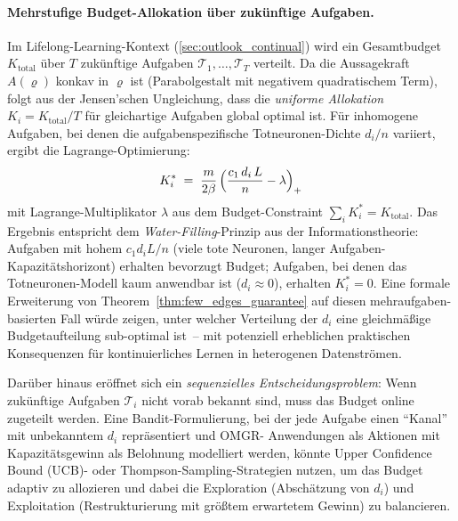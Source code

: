 ﻿\documentclass[12pt, a4paper, openany]{report}
\begin{document}
\paragraph{Mehrstufige Budget-Allokation über zukünftige Aufgaben.}
Im Lifelong-Learning-Kontext (\cref{sec:outlook_continual}) wird ein
Gesamtbudget $K_{\mathrm{total}}$ über $T$ zukünftige Aufgaben
$\mathcal{T}_1, \ldots, \mathcal{T}_T$ verteilt.  Da die Aussagekraft
$A(\varrho)$ konkav in $\varrho$ ist (Parabolgestalt mit negativem
quadratischem Term), folgt aus der Jensen'schen Ungleichung, dass die
\emph{uniforme Allokation} $K_i = K_{\mathrm{total}}/T$ für gleichartige
Aufgaben global optimal ist.  Für inhomogene Aufgaben, bei denen die
aufgabenspezifische Totneuronen-Dichte $d_i/n$ variiert, ergibt die
Lagrange-Optimierung:
\[
  K_i^*
  \;=\; \frac{m}{2\beta}\,\Bigl(\frac{c_{1}\,d_i\,L}{n} - \lambda\Bigr)_+
\]
mit Lagrange-Multiplikator $\lambda$ aus dem Budget-Constraint
$\sum_i K_i^* = K_{\mathrm{total}}$.  Das Ergebnis entspricht dem
\emph{Water-Filling}-Prinzip aus der Informationstheorie: Aufgaben mit
hohem $c_1 d_i L / n$ (viele tote Neuronen, langer Aufgaben-Kapazitätshorizont)
erhalten bevorzugt Budget; Aufgaben, bei denen das Totneuronen-Modell kaum
anwendbar ist ($d_i \approx 0$), erhalten $K_i^* = 0$.  Eine formale
Erweiterung von Theorem~\ref{thm:few_edges_guarantee} auf diesen
mehraufgaben-basierten Fall würde zeigen, unter welcher Verteilung der $d_i$
eine gleichmäßige Budgetaufteilung sub-optimal ist~-- mit potenziell
erheblichen praktischen Konsequenzen für kontinuierliches Lernen in
heterogenen Datenströmen.

Darüber hinaus eröffnet sich ein \emph{sequenzielles Entscheidungsproblem}:
Wenn zukünftige Aufgaben $\mathcal{T}_i$ nicht vorab bekannt sind, muss
das Budget online zugeteilt werden.  Eine Bandit-Formulierung, bei der jede
Aufgabe einen ``Kanal'' mit unbekanntem $d_i$ repräsentiert und OMGR-
Anwendungen als Aktionen mit Kapazitätsgewinn als Belohnung modelliert
werden, könnte Upper Confidence Bound (UCB)- oder Thompson-Sampling-Strategien
nutzen, um das Budget adaptiv zu allozieren und dabei die Exploration
(Abschätzung von $d_i$) und Exploitation (Restrukturierung mit größtem
erwartetem Gewinn) zu balancieren.
\end{document}
